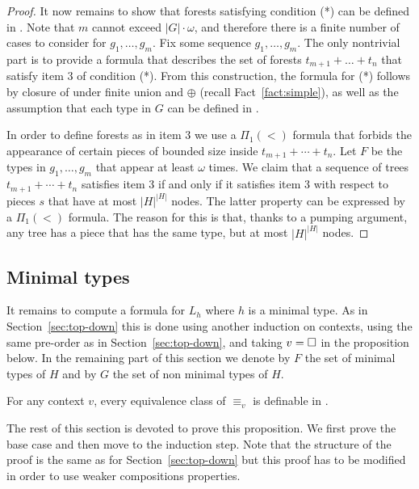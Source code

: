 \documentclass{LMCS}
\begin{document}
{\begin{proof}
It now remains to show that forests satisfying condition (*) can be defined in
\Stwo. Note that $m$ cannot exceed $|G| \cdot \omega$, and therefore there
is a finite number of cases to consider for $g_1,\ldots,g_m$. Fix some sequence
$g_1,\ldots,g_m$.  The only nontrivial part is to provide a \Stwo formula
that describes the set of forests $t_{m+1} + \ldots + t_n$ that satisfy item 3
of condition (*). From this construction, the formula for (*) follows by
closure of \Stwo under finite union and $\oplus$ (recall
Fact~\ref{fact:simple}), as well as the assumption that each type in $G$ can be
defined in \Stwo.

In order to define forests as in item 3 we use a $\Pi_1(<)$ formula that forbids
the appearance of certain pieces of bounded size inside $t_{m+1} + \cdots +
t_n$. Let $F$ be the types in $g_1,\ldots,g_m$ that appear at least $\omega$
times. We claim that a sequence of trees $t_{m+1}+\cdots +t_n$ satisfies item 3
if and only if it satisfies item 3 with respect to pieces $s$ that have at most
$|H|^{|H|}$ nodes. The latter property can be expressed by a $\Pi_1(<)$ formula.
The reason for this is that, thanks to a pumping argument, any tree has a piece
that has the same type, but at most $|H|^{|H|}$ nodes.
\end{proof}

\subsection{Minimal types}

It remains to compute a \Stwo formula for $L_h$ where $h$ is a minimal type.
As in Section~\ref{sec:top-down} this is done using another induction on
contexts, using the same pre-order as in Section~\ref{sec:top-down}, and taking
$v=\Box$ in the proposition below. In the remaining part of this section we
denote by $F$ the set of minimal types of $H$ and by $G$ the set of non minimal
types of $H$.

\begin{prop}\label{prop:contexts-nolex}
  For any context  $v$, every equivalence class of $\equiv_v$ is definable in
  \Stwo.
\end{prop}

The rest of this section is devoted to prove this proposition. We first prove
the base case and then move to the induction step. Note that the structure of
the proof is the same as for Section~\ref{sec:top-down} but this proof has to
be modified in order to use weaker compositions properties.

}
\end{document}
